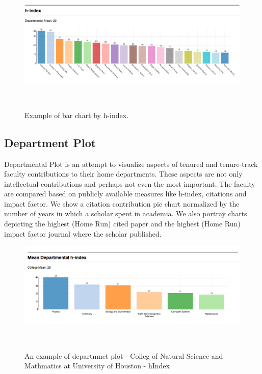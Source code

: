 \begin{figure}[H]
  \centering
  \includegraphics[width=1\textwidth]{figures/fig-CS-hIndex}
  \caption{Example of bar chart by h-index.}~\label{fig:groupplot}
\end{figure}

\subsection{Department Plot}

Departmental Plot is an attempt to visualize aspects of tenured and tenure-track faculty contributions to their home departments. These aspects are not only intellectual contributions and perhaps not even the most important. The faculty are compared based on publicly available measures like h-index, citations and impact factor. We show a citation contribution pie chart normalized by the number of years in which a scholar spent in academia. We also portray charts depicting the highest (Home Run) cited paper and the highest (Home Run) impact factor journal where the scholar published.

\begin{figure}
  \centering
  \includegraphics[width=1\textwidth]{figures/Coll-h}
  \caption{An example of departmnet plot - Colleg of Natural Science and Mathmatics at University of Houston - hIndex}~\label{fig:DP-College1}
\end{figure}

